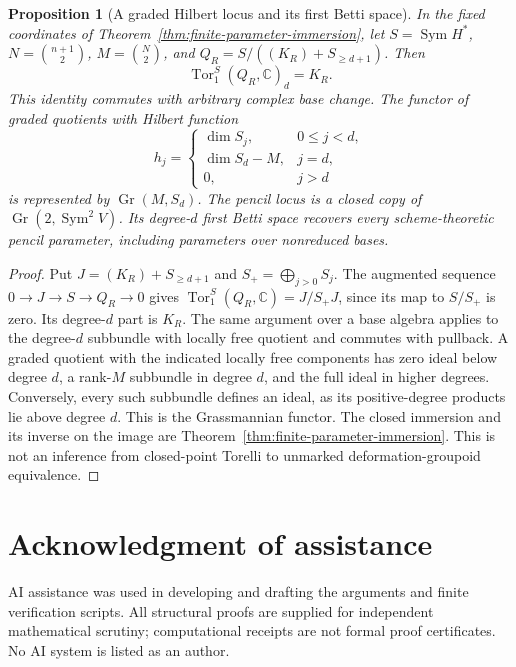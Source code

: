 \documentclass[11pt,reqno]{amsart}
\numberwithin{equation}{section}
\newtheorem{proposition}[theorem]{Proposition}
\theoremstyle{definition}\newtheorem{definition}[theorem]{Definition}
\theoremstyle{remark}\newtheorem{remark}[theorem]{Remark}
\newcommand{\C}{\mathbb C}\newcommand{\Q}{\mathbb Q}
\DeclareMathOperator{\Sym}{Sym}\DeclareMathOperator{\Gr}{Gr}
\DeclareMathOperator{\Tor}{Tor}\DeclareMathOperator{\im}{im}
\begin{document}
\begin{proposition}[A graded Hilbert locus and its first Betti space]
\label{prop:first-syzygy-hilbert}
In the fixed coordinates of Theorem~\ref{thm:finite-parameter-immersion},
let \(S=\Sym H^*\), \(N=\binom{n+1}{2}\), \(M=\binom N2\),
and \(Q_R=S/((K_R)+S_{\ge d+1})\). Then
\begin{equation}\label{eq:first-relation-tor}
                     \Tor_1^S(Q_R,\C)_d=K_R.
\end{equation}
This identity commutes with arbitrary complex base change.
The functor of graded quotients with Hilbert function
\[
 h_j=\begin{cases}\dim S_j,&0\le j<d,\\
 \dim S_d-M,&j=d,\\0,&j>d\end{cases}
\]
is represented by \(\Gr(M,S_d)\). The pencil locus is a closed
copy of \(\Gr(2,\Sym^2V)\). Its degree-\(d\) first Betti
space recovers every scheme-theoretic pencil parameter, including
parameters over nonreduced bases.
\end{proposition}
\begin{proof}
Put \(J=(K_R)+S_{\ge d+1}\) and \(S_+=\bigoplus_{j>0}S_j\).
The augmented sequence \(0\to J\to S\to Q_R\to0\) gives
\(\Tor_1^S(Q_R,\C)=J/S_+J\), since its map to \(S/S_+\)
is zero. Its degree-\(d\) part is \(K_R\). The same argument
over a base algebra applies to the degree-\(d\) subbundle with
locally free quotient and commutes with pullback.
A graded quotient with the indicated locally free components has
zero ideal below degree \(d\), a rank-\(M\) subbundle in degree
\(d\), and the full ideal in higher degrees. Conversely, every
such subbundle defines an ideal, as its positive-degree products lie
above degree \(d\). This is the Grassmannian functor. The closed
immersion and its inverse on the image are
Theorem~\ref{thm:finite-parameter-immersion}. This is not an inference
from closed-point Torelli to unmarked deformation-groupoid equivalence.
\end{proof}


\section*{Acknowledgment of assistance}
AI assistance was used in developing and drafting the arguments and
finite verification scripts.  All structural proofs are supplied for
independent mathematical scrutiny; computational receipts are not
formal proof certificates.  No AI system is listed as an author.
\end{document}
